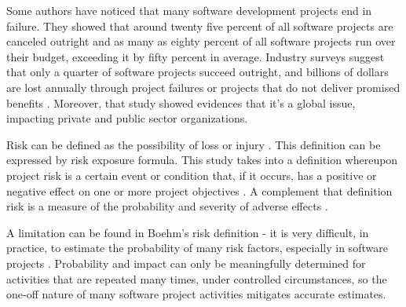 \documentclass[a4paper,twoside]{article}
\begin{document}
Some authors \cite{schmidt2001identifying} have noticed that many software development projects end in failure. They showed that around twenty five percent of all software projects are canceled outright and as many as eighty percent of all software projects run over their budget, exceeding it by fifty percent in average. Industry surveys suggest that only a quarter of software projects succeed outright, and billions of dollars are lost annually through project failures or projects that do not deliver promised benefits \cite{bannerman2008risk}. Moreover, that study showed evidences that it's a global issue, impacting private and public sector organizations.

Risk can be defined as the possibility of loss or injury \cite{BOEHM1991}. This definition can be expressed by risk exposure formula. This study takes into a definition whereupon project risk is a certain event or condition that, if it occurs, has a positive or negative effect on one or more project objectives \cite{PMBOK2008}. A complement that definition risk is a measure of the probability and severity of adverse effects \cite{haimes2011risk}.


A limitation can be found in Boehm's risk definition - it is very difficult, in practice, to estimate the probability of many risk factors, especially in software projects \cite{bannerman2008risk}. Probability and impact can only be meaningfully determined for activities that are repeated many times, under controlled circumstances, so the one-off nature of many software project activities mitigates accurate estimates.
\end{document}
